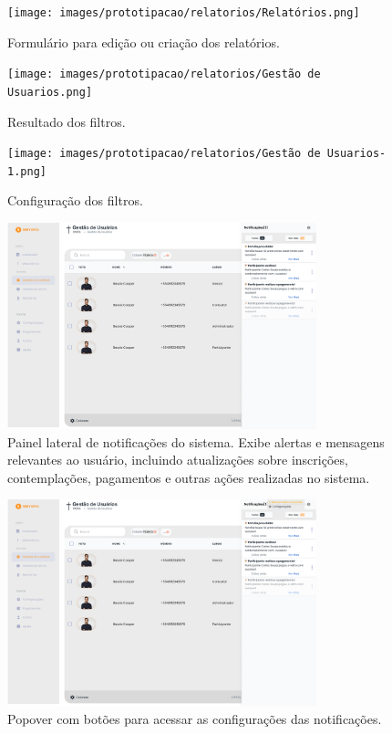 \begin{figure}[H]
\centering
\texttt{[image: images/prototipacao/relatorios/Relatórios.png]}
\caption{Formulário para edição ou criação dos relatórios.}
\end{figure}

\begin{figure}[H]
\centering
\texttt{[image: images/prototipacao/relatorios/Gestão de Usuarios.png]}
\caption{Resultado dos filtros.}
\end{figure}

\begin{figure}[H]
\centering
\texttt{[image: images/prototipacao/relatorios/Gestão de Usuarios-1.png]}
\caption{Configuração dos filtros.}
\end{figure}

\begin{figure}[H]
\centering
\includegraphics[width=0.8\textwidth]{images/prototipacao/notificacoes/Notificações.png}
\caption{Painel lateral de notificações do sistema. Exibe alertas e mensagens relevantes ao usuário, incluindo atualizações sobre inscrições, contemplações, pagamentos e outras ações realizadas no sistema.}
\end{figure}

\begin{figure}[H]
\centering
\includegraphics[width=0.8\textwidth]{images/prototipacao/notificacoes/Notificações-1.png}
\caption{Popover  com botões para acessar as configurações das notificações.}
\end{figure}

